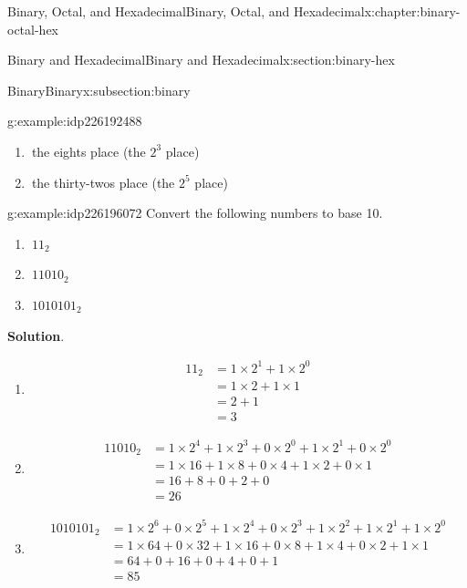 \documentclass[twoside,10pt,]{book}
\newcommand{\blocktitlefont}{\relax}
\numberwithin{equation}{section}
\newcommand{\amp}{&}
\begin{document}
\begin{chapterptx}{Binary, Octal, and Hexadecimal}{}{Binary, Octal, and Hexadecimal}{}{}{x:chapter:binary-octal-hex}
\begin{sectionptx}{Binary and Hexadecimal}{}{Binary and Hexadecimal}{}{}{x:section:binary-hex}
\begin{subsectionptx}{Binary}{}{Binary}{}{}{x:subsection:binary}
\begin{example}{}{g:example:idp226192488}
\begin{enumerate}
\item{}\(\ \)the eights place (the \(2^3\) place)%
\item{}\(\ \)the thirty-twos place (the \(2^5\) place)%
\end{enumerate}
%
\end{example}
\begin{example}{}{g:example:idp226196072}%
Convert the following numbers to base 10.%
\begin{enumerate}
\item{}\(\displaystyle \ 11_2\)%
\item{}\(\displaystyle \ 11010_2\)%
\item{}\(\displaystyle \ 1010101_2\)%
\end{enumerate}
%
\par\smallskip%
\noindent\textbf{\blocktitlefont Solution}.\label{g:solution:idp226205800}{}\hypertarget{g:solution:idp226205800}{}\quad{}%
\begin{enumerate}
\item{}%
\begin{align*}
11_2 \amp = 1\times2^1+1\times2^0\\
\amp = 1\times2 +1\times 1\\
\amp = 2 + 1\\
\amp =3
\end{align*}
%
\item{}%
\begin{align*}
11010_2 \amp = 1\times 2^4+1\times2^3+0\times2^0+1\times2^1+0\times2^0\\
\amp = 1\times16+1\times8+0\times4+1\times2+0\times1\\
\amp =16+8+0+2+0\\
\amp = 26
\end{align*}
%
\item{}%
\begin{align*}
1010101_2 \amp = 1\times2^6+0\times2^5+1\times2^4+0\times2^3+1\times2^2+1\times2^1+1\times2^0\\
\amp = 1\times64+0\times32+1\times16+0\times8+1\times4+0\times2+1\times1\\
\amp = 64+0+16+0+4+0+1\\
\amp = 85
\end{align*}
%
\end{enumerate}
%
\end{example}
\end{subsectionptx}
%
%
\typeout{************************************************}
\typeout{************************************************}

\end{sectionptx}
\end{chapterptx}
\end{document}
